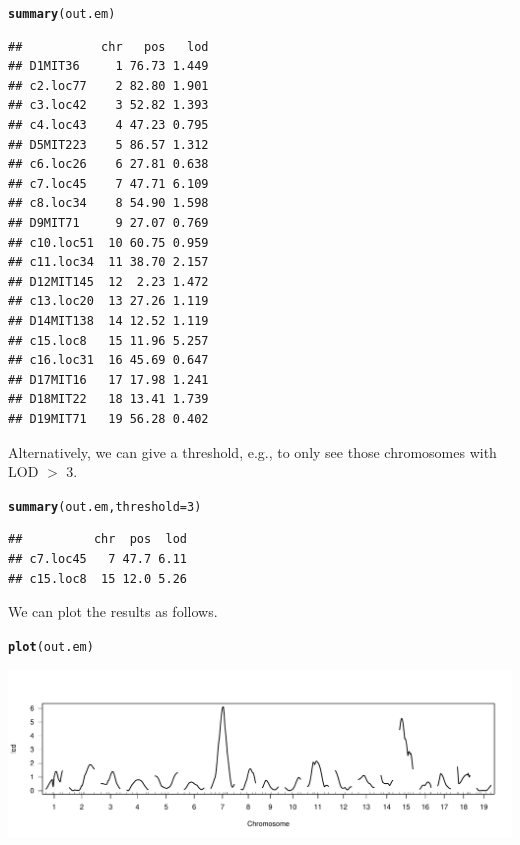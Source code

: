 \documentclass[12pt]{article}\usepackage[]{graphicx}\usepackage[]{color}
\makeatletter
\def\maxwidth{ %
  \ifdim\Gin@nat@width>\linewidth
    \linewidth
  \else
    \Gin@nat@width
  \fi
}
\newcommand{\hlnum}[1]{\textcolor[rgb]{0.686,0.059,0.569}{#1}}%
\newcommand{\hlstd}[1]{\textcolor[rgb]{0.345,0.345,0.345}{#1}}%
\newcommand{\hlkwc}[1]{\textcolor[rgb]{0.333,0.667,0.333}{#1}}%
\newcommand{\hlkwd}[1]{\textcolor[rgb]{0.737,0.353,0.396}{\textbf{#1}}}%
\newenvironment{kframe}{%
 \def\at@end@of@kframe{}%
 \ifinner\ifhmode%
  \def\at@end@of@kframe{\end{minipage}}%
  \begin{minipage}{\columnwidth}%
 \fi\fi%
 \def\FrameCommand##1{\hskip\@totalleftmargin \hskip-\fboxsep
 \colorbox{shadecolor}{##1}\hskip-\fboxsep
     \hskip-\linewidth \hskip-\@totalleftmargin \hskip\columnwidth}%
 \MakeFramed {\advance\hsize-\width
   \@totalleftmargin\z@ \linewidth\hsize
   \@setminipage}}%
 {\par\unskip\endMakeFramed%
 \at@end@of@kframe}
\newenvironment{knitrout}{}{} %
\makeatother
\begin{document}
\begin{knitrout}
\color{fgcolor}\begin{kframe}
\begin{alltt}
\hlkwd{summary}\hlstd{(out.em)}
\end{alltt}
\begin{verbatim}
##           chr   pos   lod
## D1MIT36     1 76.73 1.449
## c2.loc77    2 82.80 1.901
## c3.loc42    3 52.82 1.393
## c4.loc43    4 47.23 0.795
## D5MIT223    5 86.57 1.312
## c6.loc26    6 27.81 0.638
## c7.loc45    7 47.71 6.109
## c8.loc34    8 54.90 1.598
## D9MIT71     9 27.07 0.769
## c10.loc51  10 60.75 0.959
## c11.loc34  11 38.70 2.157
## D12MIT145  12  2.23 1.472
## c13.loc20  13 27.26 1.119
## D14MIT138  14 12.52 1.119
## c15.loc8   15 11.96 5.257
## c16.loc31  16 45.69 0.647
## D17MIT16   17 17.98 1.241
## D18MIT22   18 13.41 1.739
## D19MIT71   19 56.28 0.402
\end{verbatim}
\end{kframe}
\end{knitrout}

Alternatively, we can give a threshold, e.g., to only see those
chromosomes with LOD $>$ 3.

\begin{knitrout}
\color{fgcolor}\begin{kframe}
\begin{alltt}
\hlkwd{summary}\hlstd{(out.em,} \hlkwc{threshold}\hlstd{=}\hlnum{3}\hlstd{)}
\end{alltt}
\begin{verbatim}
##          chr  pos  lod
## c7.loc45   7 47.7 6.11
## c15.loc8  15 12.0 5.26
\end{verbatim}
\end{kframe}
\end{knitrout}

We can plot the results as follows.

\begin{knitrout}
\color{fgcolor}\begin{kframe}
\begin{alltt}
\hlkwd{plot}\hlstd{(out.em)}
\end{alltt}
\end{kframe}
\includegraphics[width=\maxwidth]{RnwFigs/plot_scanone-1} 

\end{knitrout}
\end{document}
